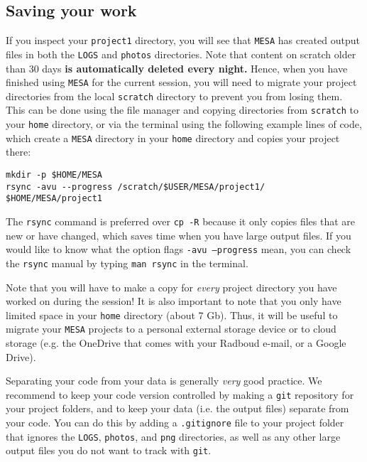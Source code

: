 \documentclass[11pt,a4paper]{article}
\begin{document}
\subsection{Saving your work}
If you inspect your \texttt{project1} directory, you will see that \texttt{MESA} has created output files in both the \texttt{LOGS} and \texttt{photos} directories.
%
Note that content on scratch older than 30 days \textbf{is automatically deleted every night.}
Hence, when you have finished using \texttt{MESA} for the current session, you will need to migrate your project directories from the local \texttt{scratch} directory to prevent you from losing them. 
%
This can be done using the file manager and copying directories from \texttt{scratch} to your \texttt{home} directory, or via the terminal using the following example lines of code, which create a \texttt{MESA} directory in your \texttt{home} directory and copies your project there:

\begin{lstlisting}
mkdir -p $HOME/MESA
rsync -avu --progress /scratch/$USER/MESA/project1/ $HOME/MESA/project1
\end{lstlisting}

\noindent
The \texttt{rsync} command is preferred over \texttt{cp -R} because it only copies files that are new or have changed, which saves time when you have large output files. If you would like to know what the option flags \texttt{-avu --progress} mean, you can check the \texttt{rsync} manual by typing \texttt{man rsync} in the terminal.

Note that you will have to make a copy for \emph{every} project directory you have worked on during the session! It is also important to note that you only have limited space in your \texttt{home} directory (about 7 Gb). Thus, it will be useful to migrate your \texttt{MESA} projects to a personal external storage device or to cloud storage (e.g. the OneDrive that comes with your Radboud e-mail, or a Google Drive). 




\begin{tcolorbox}[protipbox]
Separating your code from your data is generally \textit{very} good practice. 
We recommend to keep your code version controlled by making a \texttt{git} repository for your project folders, and to keep your data (i.e. the output files) separate from your code.
You can do this by adding a \texttt{.gitignore} file to your project folder that ignores the \texttt{LOGS}, \texttt{photos}, and \texttt{png} directories, as well as any other large output files you do not want to track with \texttt{git}.
\end{tcolorbox}
\end{document}
